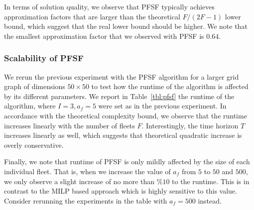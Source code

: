 \documentclass[conference]{IEEEtran}
\newcommand{\todo}[1]{{\color{red}{\bf TODO:} #1}}
\newcommand{\todo}[1]{}
\begin{document}
In terms of solution quality, we observe that PFSF typically achieves approximation factors that are larger than the theoretical $F/(2F-1)$ lower bound, which suggest that the real lower bound should be higher. We note that the smallest approximation factor that we observed with PFSF is $0.64$.

\subsubsection{Scalability of PFSF} 
We rerun the previous experiment with the PFSF algorithm for a larger grid graph of dimensions $50\times 50$ to test how the runtime of the algorithm is affected by its different parameters. We report in Table~\ref{tbl:pfsf} the runtime of the algorithm, where $I=3, a_f=5$ were set as in the previous experiment. In accordance with the theoretical complexity bound, we observe that the runtime increases linearly with the number of fleets $F$. Interestingly, the time horizon $T$ increases linearly as well, which suggests that theoretical quadratic increase is overly conservative. 

Finally, we note that runtime of PFSF is only mildly affected by the size of each individual fleet. That is, when we increase the value of $a_f$ from $5$ to $50$ and $500$, we only observe a slight increase of no more than $\%10$ to the runtime. This is in contrast to the MILP based approach which is highly sensitive to this value. \todo{Consider rerunning the experiments in the table with $a_f=500$ instead.}

\end{document}
